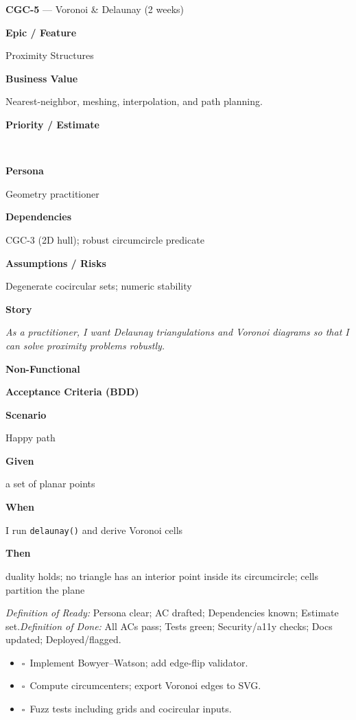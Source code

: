 \documentclass[11pt,a4paper]{article}
\newcommand{\MetaRow}[2]{%
  \noindent\begin{minipage}[t]{0.24\linewidth}\raggedleft\bfseries #1\end{minipage}%
  \hspace{0.8em}%
  \begin{minipage}[t]{0.72\linewidth}\raggedright #2\end{minipage}\par\vspace{0.3em}}
\newcommand{\CBox}{\(\square\)}
\newcommand{\BDDRow}[2]{\MetaRow{#1}{#2}}
\newenvironment{BDD}{\par\medskip}{\par\medskip}
\newcommand{\StoryTitle}[2]{\textbf{#1} --- #2}
\newcommand{\DoR}{\textit{Definition of Ready:} Persona clear; AC drafted; Dependencies known; Estimate set.}
\newcommand{\DoD}{\textit{Definition of Done:} All ACs pass; Tests green; Security/a11y checks; Docs updated; Deployed/flagged.}
\begin{document}
\begin{StoryCard}{\StoryTitle{CGC-5}{Voronoi \& Delaunay (2 weeks)}}
\MetaRow{Epic / Feature}{Proximity Structures}
\MetaRow{Business Value}{Nearest-neighbor, meshing, interpolation, and path planning.}
\MetaRow{Priority / Estimate}{\ \ \Badge{SP: 8}}
\MetaRow{Persona}{Geometry practitioner}
\MetaRow{Dependencies}{CGC-3 (2D hull); robust circumcircle predicate}
\MetaRow{Assumptions / Risks}{Degenerate cocircular sets; numeric stability}
\MetaRow{Story}{\emph{As a practitioner, I want Delaunay triangulations and Voronoi diagrams so that I can solve proximity problems robustly.}}

\medskip
\noindent\textbf{Non-Functional}\quad
{}\ \ 

\medskip
\noindent\textbf{Acceptance Criteria (BDD)}
\begin{BDD}
\BDDRow{Scenario}{Happy path}
\BDDRow{Given}{a set of planar points}
\BDDRow{When}{I run \texttt{delaunay()} and derive Voronoi cells}
\BDDRow{Then}{duality holds; no triangle has an interior point inside its circumcircle; cells partition the plane}
\end{BDD}

\medskip
{\footnotesize \DoR\quad\textbullet\quad \DoD}
\end{StoryCard}

\begin{TaskBox}
\begin{itemize}
  \item \CBox\ Implement Bowyer--Watson; add edge-flip validator.
  \item \CBox\ Compute circumcenters; export Voronoi edges to SVG.
  \item \CBox\ Fuzz tests including grids and cocircular inputs.
\end{itemize}
\end{TaskBox}

\clearpage
\end{document}
